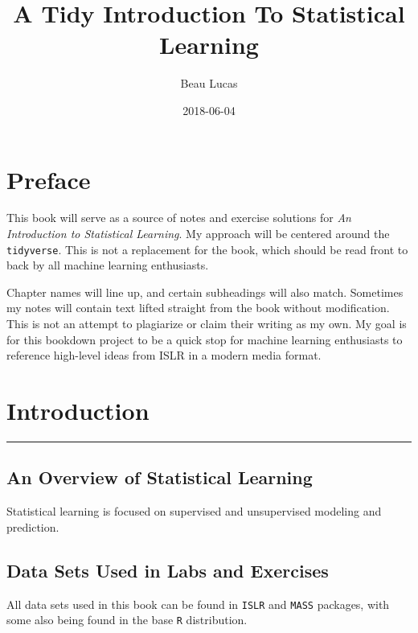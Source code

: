 \documentclass[]{book}
\title{A Tidy Introduction To Statistical Learning}
\author{Beau Lucas}
\date{2018-06-04}
\theoremstyle{definition}
\theoremstyle{definition}
\theoremstyle{definition}
\theoremstyle{remark}
\begin{document}
\maketitle

{
\setcounter{tocdepth}{1}
\tableofcontents
}
\chapter*{Preface}\label{preface}

This book will serve as a source of notes and exercise solutions for
\emph{An Introduction to Statistical Learning}. My approach will be
centered around the \texttt{tidyverse}. This is not a replacement for
the book, which should be read front to back by all machine learning
enthusiasts.

Chapter names will line up, and certain subheadings will also match.
Sometimes my notes will contain text lifted straight from the book
without modification. This is not an attempt to plagiarize or claim
their writing as my own. My goal is for this bookdown project to be a
quick stop for machine learning enthusiasts to reference high-level
ideas from ISLR in a modern media format.

\chapter{Introduction}\label{intro}

\begin{center}\rule{0.5\linewidth}{\linethickness}\end{center}

\section{An Overview of Statistical
Learning}\label{an-overview-of-statistical-learning}

Statistical learning is focused on supervised and unsupervised modeling
and prediction.

\section{Data Sets Used in Labs and
Exercises}\label{data-sets-used-in-labs-and-exercises}

All data sets used in this book can be found in \texttt{ISLR} and
\texttt{MASS} packages, with some also being found in the base
\texttt{R} distribution.
\end{document}
